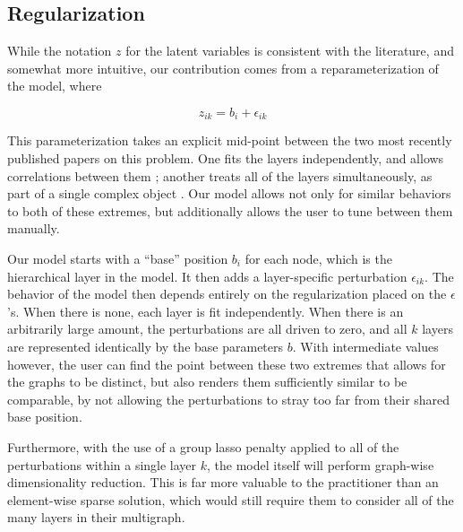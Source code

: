 \documentclass{article}
\begin{document}
\subsection{Regularization}

While the notation $z$ for the latent variables is consistent with the literature, and somewhat more intuitive, our contribution comes from a reparameterization of the model, where

\[
z_{ik} = b_i + \epsilon_{ik}
\]

This parameterization takes an explicit mid-point between the two most recently published papers on this problem. One fits the layers independently, and allows correlations between them \cite{salter-townshend2017}; another  treats all of the layers simultaneously, as part of a single complex object \cite{gollini-2016}. Our model allows not only for similar behaviors to both of these extremes, but additionally allows the user to tune between them manually.

Our model starts with a ``base'' position $b_i$ for each node, which is the hierarchical layer in the model. It then adds a layer-specific perturbation $\epsilon_{ik}$. The behavior of the model then depends entirely on the regularization placed on the $\epsilon$'s. When there is none, each layer is fit independently. When there is an arbitrarily large amount, the perturbations are all driven to zero, and all $k$ layers are represented identically by the base parameters $b$. With intermediate values however, the user can find the point between these two extremes that allows for the graphs to be distinct, but also renders them sufficiently similar to be comparable, by not allowing the perturbations to stray too far from their shared base position.

Furthermore, with the use of a group lasso penalty applied to all of the perturbations within a single layer $k$, the model itself will perform graph-wise dimensionality reduction. This is far more valuable to the practitioner than an element-wise sparse solution, which would still require them to consider all of the many layers in their multigraph. %


\end{document}
